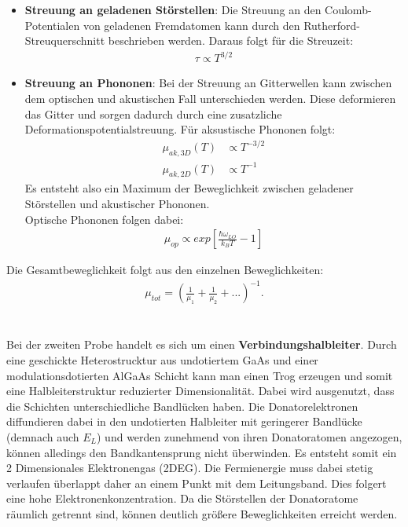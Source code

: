 \begin{itemize}
    \item \textbf{Streuung an geladenen Störstellen}:
    Die Streuung an den Coulomb-Potentialen von geladenen Fremdatomen kann durch den Rutherford-Streuquerschnitt beschrieben werden. Daraus folgt für die Streuzeit:
    \begin{align}
        \tau \propto T^{3/2}
    \end{align}
    \item \textbf{Streuung an Phononen}:
    Bei der Streuung an Gitterwellen kann zwischen dem optischen und akustischen Fall unterschieden werden. Diese deformieren das Gitter und sorgen dadurch durch eine zusatzliche Deformationspotentialstreuung. Für aksustische Phononen folgt:
\begin{align}
    \mu_{ak,3D}(T) &\propto T^{-3/2} \\
    \mu_{ak,2D}(T) &\propto T^{-1}
\end{align}
Es entsteht also ein Maximum der Beweglichkeit zwischen geladener Störstellen und akustischer Phononen.\\
Optische Phononen folgen dabei:
\begin{align}
    \mu_{op} \propto exp\left [\frac{\hbar \omega_{LO}}{k_B T} -1 \right]
\end{align}

\end{itemize}
Die Gesamtbeweglichkeit folgt aus den einzelnen Beweglichkeiten:
\begin{align}
    \mu_{tot} = \left (\frac{1}{\mu_1} +\frac{1}{\mu_2} + ...\right )^{-1}.
\end{align}
\\
\\
Bei der zweiten Probe handelt es sich um einen \textbf{Verbindungshalbleiter}. Durch eine geschickte Heterostrucktur aus undotiertem GaAs und einer modulationsdotierten AlGaAs Schicht kann man einen Trog erzeugen und somit eine Halbleiterstruktur reduzierter Dimensionalität. Dabei wird ausgenutzt, dass die Schichten unterschiedliche Bandlücken haben. Die Donatorelektronen diffundieren dabei in den undotierten Halbleiter mit geringerer Bandlücke (demnach auch $E_L$) und werden zunehmend von ihren Donatoratomen angezogen, können alledings den Bandkantensprung nicht überwinden. Es entsteht somit ein 2 Dimensionales Elektronengas (2DEG). Die Fermienergie muss dabei stetig verlaufen überlappt daher an einem Punkt mit dem Leitungsband. Dies folgert eine hohe Elektronenkonzentration. Da die Störstellen der Donatoratome räumlich getrennt sind, können deutlich größere Beweglichkeiten erreicht werden.





